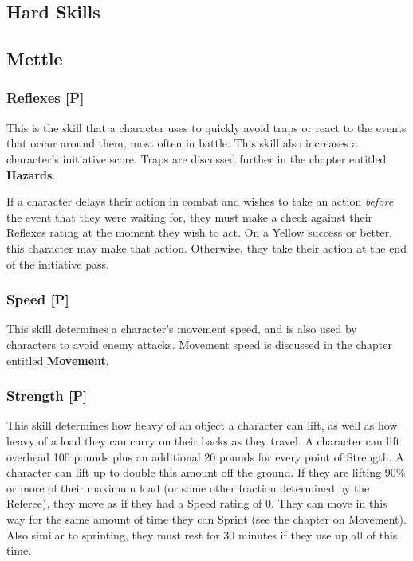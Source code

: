 \documentclass[oneside]{book}
\begin{document}
\begin{multicols}{2}

\section{Hard Skills}
\subsection{Mettle}
\subsubsection{Reflexes [P]}
This is the skill that a character uses to quickly avoid traps or react to the events that occur around them, most often in battle. This skill also increases a character's initiative score. Traps are discussed further in the chapter entitled \textbf{Hazards}.

If a character delays their action in combat and wishes to take an action \emph{before} the event that they were waiting for, they must make a check against their Reflexes rating at the moment they wish to act. On a Yellow success or better, this character may make that action. Otherwise, they take their action at the end of the initiative pass.

\subsubsection{Speed [P]}
This skill determines a character's movement speed, and is also used by characters to avoid enemy attacks. Movement speed is discussed in the chapter entitled \textbf{Movement}.

\subsubsection{Strength [P]}
This skill determines how heavy of an object a character can lift, as well as how heavy of a load they can carry on their backs as they travel. A character can lift overhead 100 pounds plus an additional 20 pounds for every point of Strength. A character can lift up to double this amount off the ground. If they are lifting 90\% or more of their maximum load (or some other fraction determined by the Referee), they move as if they had a Speed rating of 0. They can move in this way for the same amount of time they can Sprint (see the chapter on Movement). Also similar to sprinting, they must rest for 30 minutes if they use up all of this time.  


\end{multicols}
\end{document}

